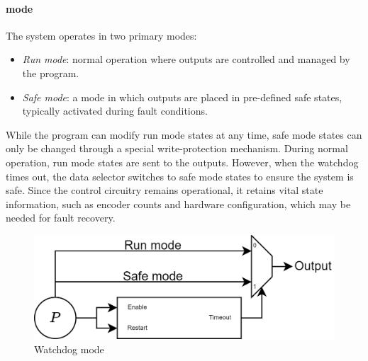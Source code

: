 \paragraph*{mode}
The system operates in two primary modes:
\begin{itemize}
    \item \textit{Run mode}: normal operation where outputs are controlled and managed by the program.
    \item \textit{Safe mode}: a mode in which outputs are placed in pre-defined safe states, typically activated during fault conditions.
\end{itemize}
While the program can modify run mode states at any time, safe mode states can only be changed through a special write-protection mechanism. 
During normal operation, run mode states are sent to the outputs. 
However, when the watchdog times out, the data selector switches to safe mode states to ensure the system is safe.
Since the control circuitry remains operational, it retains vital state information, such as encoder counts and hardware configuration, which may be needed for fault recovery.
\begin{figure}[H]
    \centering
    \includegraphics[width=0.75\linewidth]{images/wdog1.png}
    \caption{Watchdog mode}
\end{figure}

